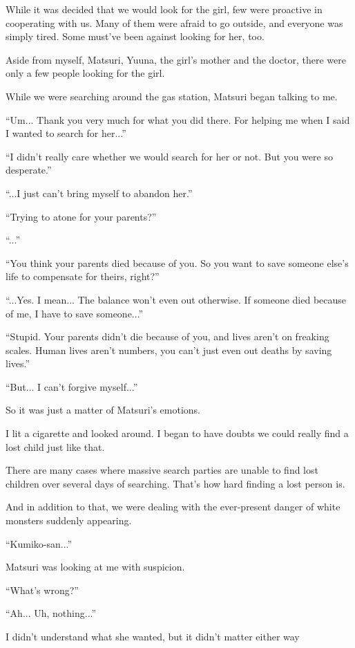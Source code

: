 While it was decided that we would look for the girl, few were proactive in cooperating with us. Many of them were afraid to go outside, and everyone was simply tired. Some must've been against looking for her, too.

Aside from myself, Matsuri, Yuuna, the girl's mother and the doctor, there were only a few people looking for the girl.

While we were searching around the gas station, Matsuri began talking to me.

``Um... Thank you very much for what you did there. For helping me when I said I wanted to search for her...''

``I didn't really care whether we would search for her or not. But you were so desperate.''

``...I just can't bring myself to abandon her.''

``Trying to atone for your parents?''

``...''

``You think your parents died because of you. So you want to save someone else's life to compensate for theirs, right?''

``...Yes. I mean... The balance won't even out otherwise. If someone died because of me, I have to save someone...''

``Stupid. Your parents didn't die because of you, and lives aren't on freaking scales. Human lives aren't numbers, you can't just even out deaths by saving lives.''

``But... I can't forgive myself...''

So it was just a matter of Matsuri's emotions.

I lit a cigarette and looked around. I began to have doubts we could really find a lost child just like that.

There are many cases where massive search parties are unable to find lost children over several days of searching. That's how hard finding a lost person is.

And in addition to that, we were dealing with the ever-present danger of white monsters suddenly appearing.

``Kumiko-san...''

Matsuri was looking at me with suspicion.

``What's wrong?''

``Ah... Uh, nothing...''

I didn't understand what she wanted, but it didn't matter either way

